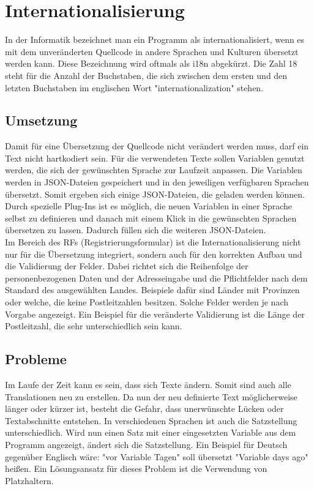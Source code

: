 \chapter{Internationalisierung}
In der Informatik bezeichnet man ein Programm als internationalisiert, wenn es mit dem unveränderten Quellcode in andere Sprachen und Kulturen übersetzt werden kann. Diese Bezeichnung wird oftmals als i18n abgekürzt. Die Zahl 18 steht für die Anzahl der Buchstaben, die sich zwischen dem ersten und den letzten Buchstaben im englischen Wort "internationalization" stehen. \autocite{wikii18n}
\section{Umsetzung}
Damit für eine Übersetzung der Quellcode nicht verändert werden muss, darf ein Text nicht hartkodiert sein. Für die verwendeten Texte sollen Variablen genutzt werden, die sich der gewünschten Sprache zur Laufzeit anpassen. Die Variablen werden in JSON-Dateien gespeichert und in den jeweiligen verfügbaren Sprachen übersetzt. Somit ergeben sich einige JSON-Dateien, die geladen werden können. Durch spezielle Plug-Ins ist es möglich, die neuen Variablen in einer Sprache selbst zu definieren und danach mit einem Klick in die gewünschten Sprachen übersetzen zu lassen. Dadurch füllen sich die weiteren JSON-Dateien.\autocite{wikii18n}\\
Im Bereich des RFs (Registrierungsformular) ist die Internationalisierung nicht nur für die Übersetzung integriert, sondern auch für den korrekten Aufbau und die Validierung der Felder. Dabei richtet sich die Reihenfolge der personenbezogenen Daten und der Adresseingabe und die Pflichtfelder nach dem Standard des ausgewählten Landes. Beispiele dafür sind Länder mit Provinzen oder welche, die keine Postleitzahlen besitzen. Solche Felder werden je nach Vorgabe angezeigt. Ein Beispiel für die veränderte Validierung ist die Länge der Postleitzahl, die sehr unterschiedlich sein kann.\autocite{wikii18n}
\section{Probleme}
Im Laufe der Zeit kann es sein, dass sich Texte ändern. Somit sind auch alle Translationen neu zu erstellen. Da nun der neu definierte Text möglicherweise länger oder kürzer ist, besteht die Gefahr, dass unerwünschte Lücken oder Textabschnitte entstehen. In verschiedenen Sprachen ist auch die Satzstellung unterschiedlich. Wird nun einen Satz mit einer eingesetzten Variable aus dem Programm angezeigt, ändert sich die Satzstellung. Ein Beispiel für Deutsch gegenüber Englisch wäre: "vor {Variable} Tagen" soll übersetzt "{Variable} days ago" heißen. Ein Lösungsansatz für dieses Problem ist die Verwendung von Platzhaltern.\autocite{wikii18n}